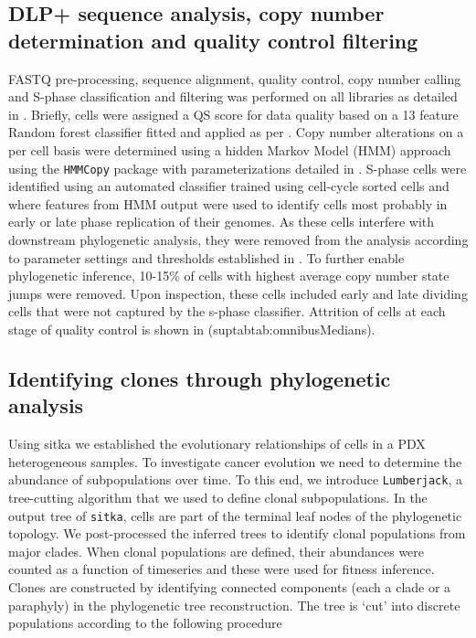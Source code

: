 \subsection{DLP+ sequence analysis, copy number determination and quality control filtering}
FASTQ pre-processing, sequence alignment, quality control, copy number calling and S-phase classification and filtering was performed on all libraries as detailed in \cite{laks2019clonal}. Briefly, cells were assigned a QS score for data quality based on a 13 feature Random forest classifier fitted and applied as per \cite{laks2019clonal}. Copy number alterations on a per cell basis were determined using a hidden Markov Model (HMM) approach using the \texttt{HMMCopy} package with parameterizations detailed in \cite{laks2019clonal}. S-phase cells were identified using an automated classifier trained using cell-cycle sorted cells and where features from HMM output were used to identify cells most probably in early or late phase replication of their genomes. As these cells interfere with downstream phylogenetic analysis, they were removed from the analysis according to parameter settings and thresholds established in \cite{laks2019clonal}. To further enable phylogenetic inference, 10-15\% of cells with highest average copy number state jumps were removed. Upon inspection, these cells included early and late dividing cells that were not captured by the s-phase classifier. 
Attrition of cells at each stage of quality control is shown in (suptabtab:omnibusMedians).



\subsection{Identifying clones through phylogenetic analysis}
Using sitka we established the evolutionary relationships of cells in a PDX heterogeneous samples. To investigate cancer evolution we need to determine the abundance of subpopulations over time. To this end, we introduce \texttt{Lumberjack}, a tree-cutting algorithm that we used to define clonal subpopulations. In the output tree of \texttt{sitka}, cells are part of the terminal leaf nodes of the phylogenetic topology. We post-processed the inferred trees to identify clonal populations from major clades. When clonal populations are defined, their abundances were counted as a function of timeseries and these were used for fitness inference. 
Clones are constructed by identifying connected components (each a clade or a paraphyly) in the phylogenetic tree reconstruction. The tree is `cut' into discrete populations according to the following procedure

